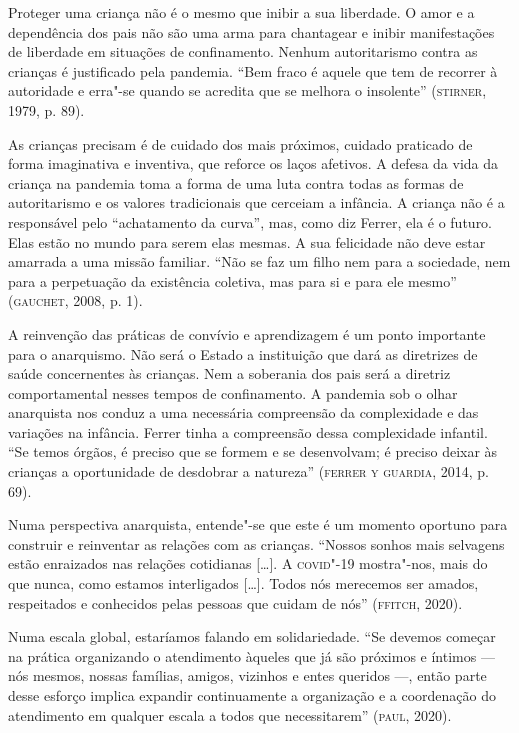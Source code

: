 Proteger uma criança não é o mesmo que inibir a sua liberdade. O amor e
a dependência dos pais não são uma arma para chantagear e inibir
manifestações de liberdade em situações de confinamento. Nenhum
autoritarismo contra as crianças é justificado pela pandemia. ``Bem
fraco é aquele que tem de recorrer à autoridade e erra"-se quando se
acredita que se melhora o insolente'' (\textsc{stirner}, 1979, p. 89).

As crianças precisam é de cuidado dos mais próximos, cuidado praticado
de forma imaginativa e inventiva, que reforce os laços afetivos. A
defesa da vida da criança na pandemia toma a forma de uma luta contra
todas as formas de autoritarismo e os valores tradicionais que cerceiam
a infância. A criança não é a responsável pelo ``achatamento da curva'',
mas, como diz Ferrer, ela é o futuro. Elas estão no mundo para serem
elas mesmas. A sua felicidade não deve estar amarrada a uma missão
familiar. ``Não se faz um filho nem para a sociedade, nem para a
perpetuação da existência coletiva, mas para si e para ele mesmo''
(\textsc{gauchet}, 2008, p. 1).

A reinvenção das práticas de convívio e aprendizagem é um ponto
importante para o anarquismo. Não será o Estado a instituição que dará
as diretrizes de saúde concernentes às crianças. Nem a soberania dos
pais será a diretriz comportamental nesses tempos de confinamento. A
pandemia sob o olhar anarquista nos conduz a uma necessária compreensão
da complexidade e das variações na infância. Ferrer tinha a compreensão
dessa complexidade infantil. ``Se temos órgãos, é preciso que se formem
e se desenvolvam; é preciso deixar às crianças a oportunidade de
desdobrar a natureza'' (\textsc{ferrer y guardia}, 2014, p. 69).

Numa perspectiva anarquista, entende"-se que este é um momento oportuno
para construir e reinventar as relações com as crianças. ``Nossos sonhos
mais selvagens estão enraizados nas relações cotidianas {[}\ldots{}{]}. A
\textsc{covid}"-19 mostra"-nos, mais do que nunca, como estamos interligados
{[}\ldots{}{]}. Todos nós merecemos ser amados, respeitados e conhecidos
pelas pessoas que cuidam de nós'' (\textsc{ffitch}, 2020).

Numa escala global, estaríamos falando em solidariedade. ``Se devemos
começar na prática organizando o atendimento àqueles que já são próximos
e íntimos --- nós mesmos, nossas famílias, amigos, vizinhos e entes
queridos ---, então parte desse esforço implica expandir continuamente a
organização e a coordenação do atendimento em qualquer escala a todos
que necessitarem'' (\textsc{paul}, 2020).

